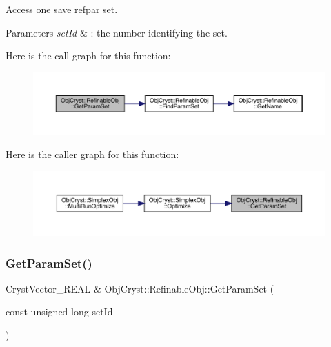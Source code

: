 Access one save refpar set. 


\begin{DoxyParams}{Parameters}
{\em set\+Id} & \+: the number identifying the set. \\
\hline
\end{DoxyParams}
Here is the call graph for this function\+:
\nopagebreak
\begin{figure}[H]
\begin{center}
\leavevmode
\includegraphics[width=350pt]{class_obj_cryst_1_1_refinable_obj_a8c542c9935105d88c38cc83b7b4dc506_cgraph}
\end{center}
\end{figure}
Here is the caller graph for this function\+:
\nopagebreak
\begin{figure}[H]
\begin{center}
\leavevmode
\includegraphics[width=350pt]{class_obj_cryst_1_1_refinable_obj_a8c542c9935105d88c38cc83b7b4dc506_icgraph}
\end{center}
\end{figure}
\mbox{\label{class_obj_cryst_1_1_refinable_obj_abbc5f8e9aaf4dcd7dbe96233ad96f5e0}} 
\subsubsection{\texorpdfstring{GetParamSet()}{GetParamSet()}\hspace{0.1cm}{\footnotesize\ttfamily [2/2]}}
{\footnotesize\ttfamily Cryst\+Vector\+\_\+\+R\+E\+AL \& Obj\+Cryst\+::\+Refinable\+Obj\+::\+Get\+Param\+Set (\begin{DoxyParamCaption}\item[{const unsigned long}]{set\+Id }\end{DoxyParamCaption})}



